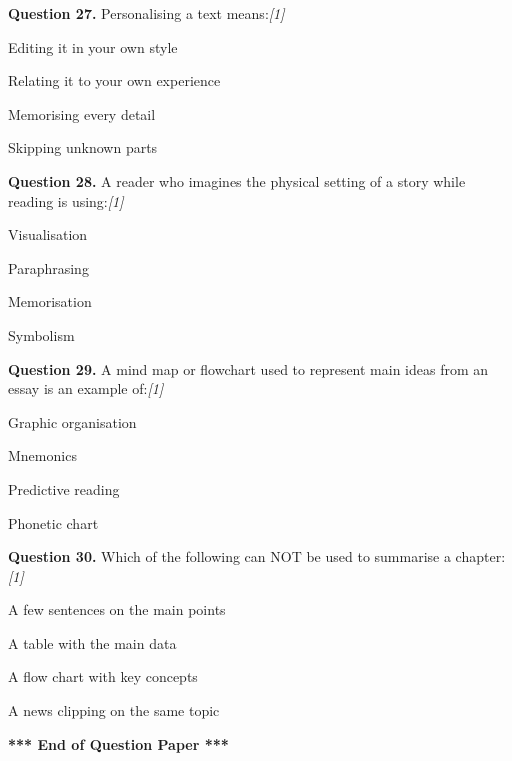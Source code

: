 \documentclass[11pt,a4paper]{article}
\newcommand{\pts}[1]{\hfill \textit{[#1]}}
\begin{document}
\medskip




\noindent \textbf{Question 27.} Personalising a text means:\pts{1}

\begin{parts}
  \item Editing it in your own style
  \item Relating it to your own experience
  \item Memorising every detail
  \item Skipping unknown parts
\end{parts}

\medskip




\noindent \textbf{Question 28.} A reader who imagines the physical setting of a story while reading is using:\pts{1}

\begin{parts}
  \item Visualisation
  \item Paraphrasing
  \item Memorisation
  \item Symbolism
\end{parts}

\medskip




\noindent \textbf{Question 29.} A mind map or flowchart used to represent main ideas from an essay is an example of:\pts{1}

\begin{parts}
  \item Graphic organisation
  \item Mnemonics
  \item Predictive reading
  \item Phonetic chart
\end{parts}

\medskip




\noindent \textbf{Question 30.} Which of the following can NOT be used to summarise a chapter:\pts{1}

\begin{parts}
  \item A few sentences on the main points
  \item A table with the main data
  \item A flow chart with key concepts
  \item A news clipping on the same topic
\end{parts}

\bigskip

\begin{center}
  \textbf{*** End of Question Paper ***}
\end{center}
\end{document}
